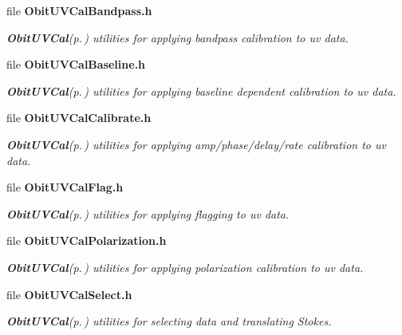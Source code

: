 \begin{CompactItemize}
\item 
file {\bf Obit\-UVCal\-Bandpass.h}
\begin{CompactList}\small\item\em {\bf Obit\-UVCal}{\rm (p.\,\pageref{structObitUVCal})} utilities for applying bandpass calibration to uv data. \item\end{CompactList}

\item 
file {\bf Obit\-UVCal\-Baseline.h}
\begin{CompactList}\small\item\em {\bf Obit\-UVCal}{\rm (p.\,\pageref{structObitUVCal})} utilities for applying baseline dependent calibration to uv data. \item\end{CompactList}

\item 
file {\bf Obit\-UVCal\-Calibrate.h}
\begin{CompactList}\small\item\em {\bf Obit\-UVCal}{\rm (p.\,\pageref{structObitUVCal})} utilities for applying amp/phase/delay/rate calibration to uv data. \item\end{CompactList}

\item 
file {\bf Obit\-UVCal\-Flag.h}
\begin{CompactList}\small\item\em {\bf Obit\-UVCal}{\rm (p.\,\pageref{structObitUVCal})} utilities for applying flagging to uv data. \item\end{CompactList}

\item 
file {\bf Obit\-UVCal\-Polarization.h}
\begin{CompactList}\small\item\em {\bf Obit\-UVCal}{\rm (p.\,\pageref{structObitUVCal})} utilities for applying polarization calibration to uv data. \item\end{CompactList}

\item 
file {\bf Obit\-UVCal\-Select.h}
\begin{CompactList}\small\item\em {\bf Obit\-UVCal}{\rm (p.\,\pageref{structObitUVCal})} utilities for selecting data and translating Stokes. \item\end{CompactList}


\end{CompactItemize}
